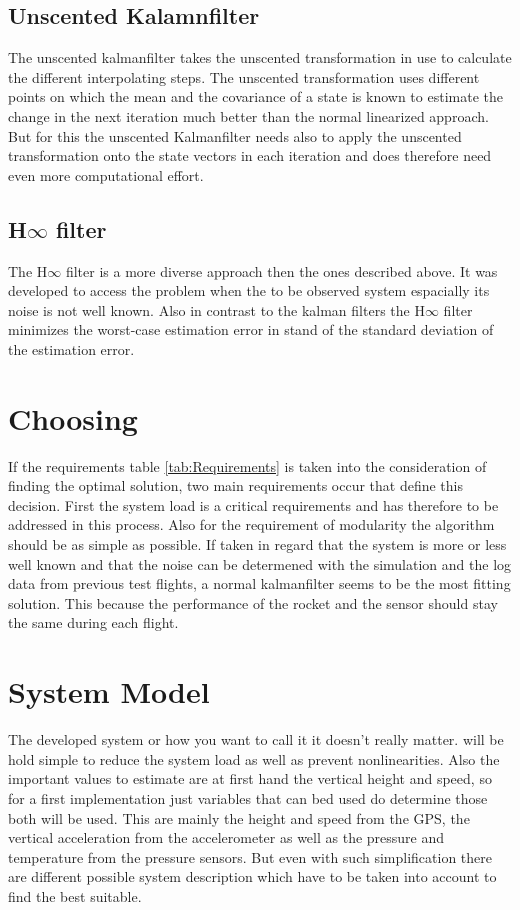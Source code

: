   \subsection{Unscented Kalamnfilter}
  The unscented kalmanfilter takes the unscented transformation in use to calculate the different interpolating steps.
  The unscented transformation uses different points on which the mean and the covariance of a state is known to estimate the 
  change in the next iteration much better than the normal linearized approach.
  But for this the unscented Kalmanfilter needs also to apply the unscented transformation onto the state vectors in each iteration
  and does therefore need even more computational effort.
  
  \subsection{H$\infty$ filter}
  The H$\infty$ filter is a more diverse approach then the ones described above.
  It was developed to access the problem when the to be observed system espacially its noise is not well known.
  Also in contrast to the kalman filters the H$\infty$ filter minimizes the worst-case estimation error 
  in stand of the standard deviation of the estimation error.
  
  \section{Choosing}
  If the requirements table \ref{tab:Requirements} is taken into the consideration of finding
  the optimal solution, two main requirements occur that define this decision.
  First the system load is a critical requirements and has therefore to be addressed in this process.
  Also for the requirement of modularity the algorithm should be as simple as possible.
  If taken in regard that the system is more or less well known and that the noise can be
  determened with the simulation and the log data from previous test flights,
  a normal kalmanfilter seems to be the most fitting solution.
  This because the performance of the rocket and the sensor should stay the same during
  each flight. 
  
  \section{System Model}
  The developed system or how you want to call it it doesn't really matter.
  will be hold simple to reduce the system load as well as prevent nonlinearities.
  Also the important values to estimate are at first hand the vertical height and speed, so
  for a first implementation just variables that can bed used do determine those both will be used.
  This are mainly the height and speed from the GPS, the vertical acceleration from the accelerometer
  as well as the pressure and temperature from the pressure sensors.
  But even with such simplification there are different possible system description which have to be taken into account 
  to find the best suitable.
  
